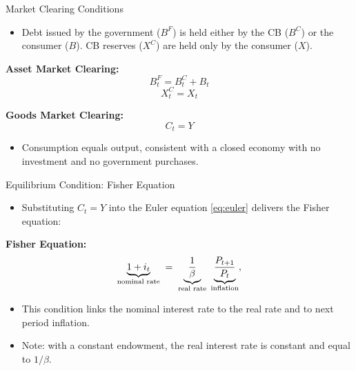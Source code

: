 \documentclass[11pt,aspectratio=169]{beamer}
\begin{document}
\begin{frame}[label=gdp_exp]{Market Clearing Conditions}

\begin{itemize}
    \item Debt issued by the government ($B^F$) is held either by the CB ($B^C$) or the consumer ($B$). CB reserves ($X^C$) are held only by the consumer ($X$).
\end{itemize}

\vspace{0.25cm}
\noindent\textbf{Asset Market Clearing:}
\begin{equation}
B_t^{F} = B_t^{C}+B_t
\label{eq: Bonds}
\end{equation}
\begin{equation}
X_t^{C} = X_t
\label{eq: reserves}
\end{equation}

\vspace{0.25cm}
\noindent\textbf{Goods Market Clearing:}
\[
C_t=Y
\]

\begin{itemize}
    \item Consumption equals output, consistent with a closed economy with no investment and no government purchases.
\end{itemize}

\vspace{0.3cm}
\begin{center}
\hyperlink{gdp_proof}{}
\end{center}

\end{frame}
\begin{frame}{Equilibrium Condition: Fisher Equation}
\begin{itemize}
  \item Substituting $C_t = Y$ into the Euler equation \eqref{eq:euler} delivers the Fisher equation:
\end{itemize}

\vspace{0.25cm}
\noindent\textbf{Fisher Equation:}
\begin{equation}
\underbrace{1 + i_t}_{\text{\scriptsize nominal rate}}
\;=\;
\underbrace{\frac{1}{\beta}}_{\text{\scriptsize real rate}}
\;\underbrace{\frac{P_{t+1}}{P_t}}_{\text{\scriptsize inflation}},
\label{eq: Fisher}
\end{equation}


\begin{itemize}
  \item This condition links the nominal interest rate to the real rate and to next period inflation.
  \item Note: with a constant endowment, the real interest rate is constant and equal to $1/\beta$.
\end{itemize}
\end{frame}
\end{document}
